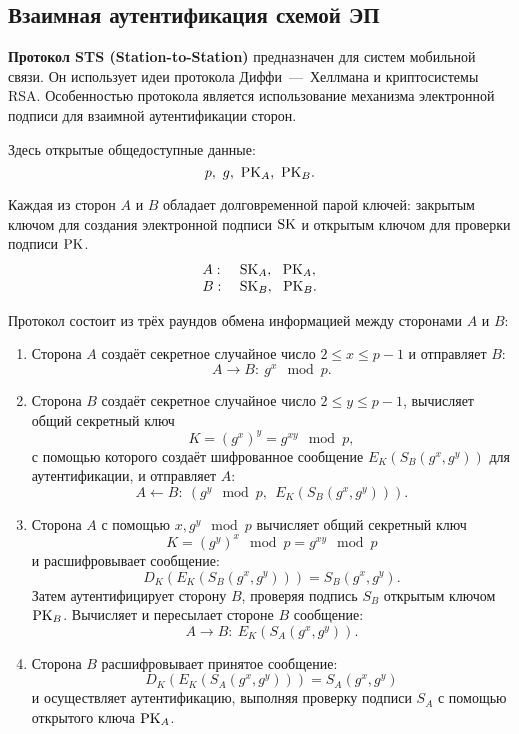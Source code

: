 \subsection{Взаимная аутентификация схемой ЭП}

\textbf{Протокол STS (Station-to-Station)} предназначен для систем мобильной связи. Он использует идеи протокола Диффи~---~Хеллмана и криптосистемы RSA. Особенностью протокола является использование механизма электронной подписи для взаимной аутентификации сторон.

Здесь открытые общедоступные данные:
    \[ p, ~ g, ~ \textrm{PK}_A, ~ \textrm{PK}_B. \]

Каждая из сторон $A$ и $B$ обладает долговременной парой ключей: закрытым ключом для создания электронной подписи $\textrm{SK}$ и открытым ключом для проверки подписи $\textrm{PK}$.
\[ \begin{array}{ll}
    A: & ~ \textrm{SK}_A, ~~ \textrm{PK}_A, \\
    B: & ~ \textrm{SK}_B, ~~ \textrm{PK}_B. \\
\end{array} \]

Протокол состоит из трёх раундов обмена информацией между сторонами $A$ и $B$:
\begin{enumerate}
    \item Сторона $A$ создаёт секретное случайное число $2 \leq x \leq p-1$ и отправляет $B$:
            \[ A \rightarrow B: ~ g^x \mod p. \]
    \item Сторона $B$ создаёт секретное случайное число $2 \leq y \leq p-1$, вычисляет общий секретный ключ
            \[ K = (g^x)^y = g^{xy} \mod p, \]
        с помощью которого создаёт шифрованное сообщение $E_K(S_B(g^x, g^y))$ для аутентификации, и отправляет $A$:
            \[ A \leftarrow B: ~ \left( g^y \mod p, ~~ E_K( S_B( g^x, g^y)) \right). \]
    \item Сторона $A$ с помощью $x, g^y \mod p$ вычисляет общий секретный ключ
            \[ K = (g^y)^x \mod p = g^{xy} \mod p \]
        и расшифровывает сообщение:
            \[ D_K( E_K( S_B( g^x, g^y))) = S_B( g^x, g^y). \]
            Затем аутентифицирует сторону $B$, проверяя подпись $S_B$ открытым ключом $\textrm{PK}_B$. Вычисляет и пересылает стороне $B$ сообщение:
            \[ A \rightarrow B: ~ E_K( S_A( g^x, g^y)). \]
    \item Сторона $B$ расшифровывает принятое сообщение:
            \[ D_K( E_K( S_A( g^x, g^y))) = S_A( g^x, g^y) \]
        и осуществляет аутентификацию, выполняя проверку подписи $S_A$ с помощью открытого ключа $\textrm{PK}_A$.
\end{enumerate}

